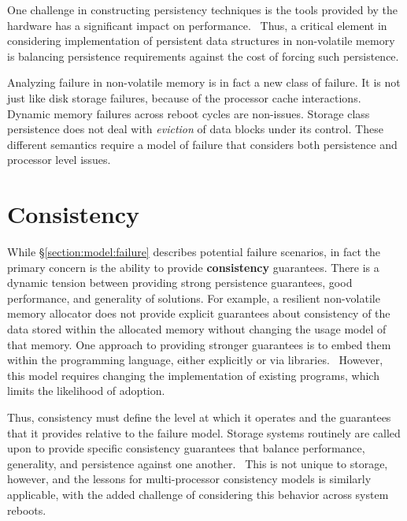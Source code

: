 One challenge in constructing persistency techniques is the tools provided by the hardware 
has a significant impact on performance.~\cite{lee2017wort,venkataraman2011consistent}  
Thus, a critical element in considering implementation of persistent data structures 
in non-volatile memory is balancing persistence requirements against the cost of forcing such persistence.

Analyzing failure in non-volatile memory is in fact a new class of failure.  It is not just like disk
storage failures, because of the processor cache interactions.  Dynamic memory failures across reboot
cycles are non-issues.  Storage class persistence does not deal with \textit{eviction} of data blocks
under its control.  These different semantics require a model of failure that considers both
persistence and processor level issues.~\cite{oukid2016testing,oukid2017data}

\section{Consistency}\label{section:model:consistency}

While \S \ref{section:model:failure} describes potential failure scenarios, in fact the primary
concern is the ability to provide \textbf{consistency} guarantees.  There is a dynamic tension
between providing strong persistence guarantees, good performance, and generality of solutions.
For example, a resilient non-volatile memory allocator does not provide explicit guarantees
about consistency of the data stored within the allocated memory without changing the usage
model of that memory.  One approach to providing stronger guarantees is to embed them within
the programming language, either explicitly or via libraries.~\cite{kolli2017architecting}
However, this model requires changing the implementation of existing programs, which limits
the likelihood of adoption.

Thus, consistency must define the level at which it operates and the guarantees that it
provides relative to the failure model.  Storage systems routinely are called upon to
provide specific consistency guarantees that balance performance, generality, and persistence
against one another.~\cite{sigurbjarnarson2016push,fryer2012recon,chen2015using}  This
is not unique to storage, however, and the lessons for multi-processor consistency models
is similarly applicable, with the added challenge of considering this behavior across
system reboots.~\cite{adve1996shared}

